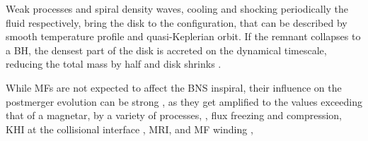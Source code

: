 Weak processes and spiral density waves, cooling and shocking periodically the 
fluid respectively, bring the disk to the configuration, that can be described by smooth 
temperature profile 
and quasi-Keplerian orbit.
%
If the remnant collapses to a \ac{BH}, the densest part of the disk is 
accreted on the dynamical timescale, reducing the total mass by half 
and disk shrinks \citep{Perego:2019adq}.

While \acp{MF} are not expected to affect the \ac{BNS} inspiral, their influence 
on the postmerger evolution can be strong \citep{Duez:2006qe,Kiuchi:2017zzg}, as they get amplified 
to the values exceeding that of a magnetar, 
by a variety of processes, 
\eg, flux freezing and compression, \ac{KHI} at the collisional interface \citep{Kiuchi:2015sga},
\ac{MRI}, \citep{Duez:2006qe,Kiuchi:2017zzg} and \ac{MF} winding \citep{Duez:2006qe},

